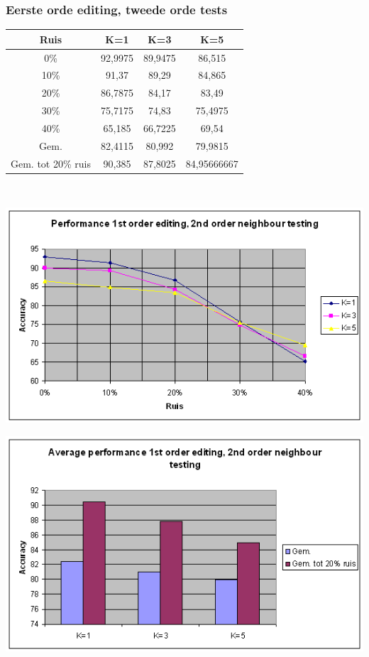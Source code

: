 \documentclass{article}
\begin{document}
\subsubsection{Eerste orde editing, tweede orde tests}

\begin{tabular}{|c|c|c|c|} \hline
Ruis &	K=1 &	K=3 &	K=5 \\ \hline
0\% &	92,9975 &	89,9475 &	86,515 \\
10\%	 & 91,37 & 	89,29 &	84,865 \\
20\%	 & 86,7875 & 	84,17 &	83,49 \\
30\%	& 75,7175 & 	74,83 &	75,4975 \\
40\% & 65,185	& 66,7225 &	69,54 \\
Gem.	& 82,4115	& 80,992 &	79,9815 \\
Gem. tot 20\% ruis &	90,385 &	87,8025 &	84,95666667 \\ \hline
\end{tabular} \\

\begin{center} \includegraphics[scale=0.7]{xor_1stordedit_2ndordtest_lijn} \end{center}
\begin{center} \includegraphics[scale=0.7]{xor_1stordedit_2ndordtest_staaf} \end{center}
\end{document}

